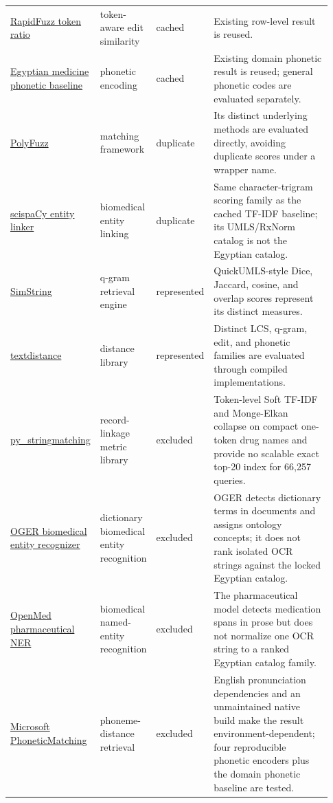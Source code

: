 \begin{landscape}
\begin{scriptsize}
\begin{longtable}{@{}L{0.24\linewidth}L{0.15\linewidth}L{0.12\linewidth}L{0.42\linewidth}@{}}
\href{https://github.com/rapidfuzz/RapidFuzz}{RapidFuzz token ratio} & token-aware edit similarity & cached & Existing row-level result is reused. \\
\href{https://github.com/microsoft/PhoneticMatching}{Egyptian medicine phonetic baseline} & phonetic encoding & cached & Existing domain phonetic result is reused; general phonetic codes are evaluated separately. \\
\href{https://github.com/MaartenGr/PolyFuzz}{PolyFuzz} & matching framework & duplicate & Its distinct underlying methods are evaluated directly, avoiding duplicate scores under a wrapper name. \\
\href{https://github.com/allenai/scispacy}{scispaCy entity linker} & biomedical entity linking & duplicate & Same character-trigram scoring family as the cached TF-IDF baseline; its UMLS/RxNorm catalog is not the Egyptian catalog. \\
\href{https://github.com/chokkan/simstring}{SimString} & q-gram retrieval engine & represented & QuickUMLS-style Dice, Jaccard, cosine, and overlap scores represent its distinct measures. \\
\href{https://github.com/life4/textdistance}{textdistance} & distance library & represented & Distinct LCS, q-gram, edit, and phonetic families are evaluated through compiled implementations. \\
\href{https://github.com/anhaidgroup/py_stringmatching}{py\_stringmatching} & record-linkage metric library & excluded & Token-level Soft TF-IDF and Monge-Elkan collapse on compact one-token drug names and provide no scalable exact top-20 index for 66,257 queries. \\
\href{https://github.com/OntoGene/OGER}{OGER biomedical entity recognizer} & dictionary biomedical entity recognition & excluded & OGER detects dictionary terms in documents and assigns ontology concepts; it does not rank isolated OCR strings against the locked Egyptian catalog. \\
\href{https://github.com/maziyarpanahi/openmed}{OpenMed pharmaceutical NER} & biomedical named-entity recognition & excluded & The pharmaceutical model detects medication spans in prose but does not normalize one OCR string to a ranked Egyptian catalog family. \\
\href{https://github.com/microsoft/PhoneticMatching}{Microsoft PhoneticMatching} & phoneme-distance retrieval & excluded & English pronunciation dependencies and an unmaintained native build make the result environment-dependent; four reproducible phonetic encoders plus the domain phonetic baseline are tested. \\

\end{longtable}
\end{scriptsize}
\end{landscape}
